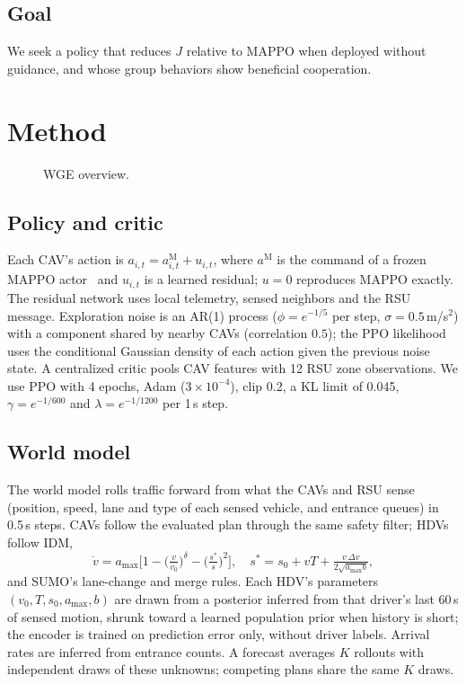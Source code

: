 \documentclass[conference]{IEEEtran}
\newcommand{\phbox}[1]{\fbox{\parbox[c][#1][c]{0.95\columnwidth}{\centering\Large \textcolor{red}{[to be filled in]}}}}
\begin{document}
\subsection{Goal}
We seek a policy that reduces $J$ relative to MAPPO when deployed without guidance, and whose group behaviors show beneficial cooperation.

\section{Method}

\begin{figure}[t]
\centering
\phbox{4.2cm}
\caption{WGE overview.}
\label{fig:method}
\end{figure}

\subsection{Policy and critic}
Each CAV's action is $a_{i,t}=a^{\mathrm{M}}_{i,t}+u_{i,t}$, where $a^{\mathrm{M}}$ is the command of a frozen MAPPO actor~\cite{yu_mappo2022} and $u_{i,t}$ is a learned residual; $u=0$ reproduces MAPPO exactly. The residual network uses local telemetry, sensed neighbors and the RSU message. Exploration noise is an AR(1) process ($\phi=e^{-1/5}$ per step, $\sigma=0.5$\,m/s$^2$) with a component shared by nearby CAVs (correlation $0.5$); the PPO likelihood uses the conditional Gaussian density of each action given the previous noise state. %
A centralized critic pools CAV features with 12 RSU zone observations. We use PPO with 4 epochs, Adam ($3\times10^{-4}$), clip 0.2, a KL limit of 0.045, $\gamma=e^{-1/600}$ and $\lambda=e^{-1/1200}$ per 1\,s step. %

\subsection{World model}
The world model rolls traffic forward from what the CAVs and RSU sense (position, speed, lane and type of each sensed vehicle, and entrance queues) in 0.5\,s steps. CAVs follow the evaluated plan through the same safety filter; HDVs follow IDM,
\begin{equation}
\dot v = a_{\max}\Big[1-\big(\tfrac{v}{v_0}\big)^{\delta}-\big(\tfrac{s^*}{s}\big)^2\Big],\quad
s^* = s_0 + vT + \tfrac{v\,\Delta v}{2\sqrt{a_{\max} b}},
\end{equation}
and SUMO's lane-change and merge rules. Each HDV's parameters $(v_0,T,s_0,a_{\max},b)$ are drawn from a posterior inferred from that driver's last 60\,s of sensed motion, shrunk toward a learned population prior when history is short; the encoder is trained on prediction error only, without driver labels. Arrival rates are inferred from entrance counts. A forecast averages $K$ rollouts with independent draws of these unknowns; competing plans share the same $K$ draws. %
\end{document}
